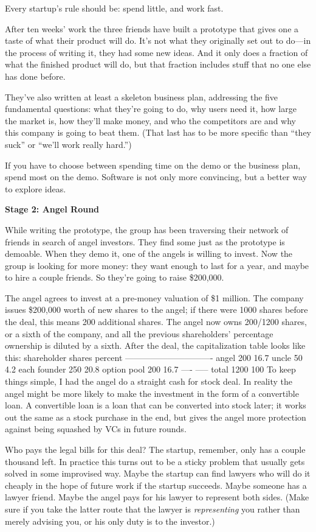 \documentclass[12pt]{book}
\begin{document}
Every startup's rule should be: spend little, and work fast.

After ten weeks' work the three friends have built a prototype that
gives one a taste of what their product will do. It's not what they
originally set out to do---in the process of writing it, they had some
new ideas. And it only does a fraction of what the finished product will
do, but that fraction includes stuff that no one else has done before.

They've also written at least a skeleton business plan, addressing the
five fundamental questions: what they're going to do, why users need it,
how large the market is, how they'll make money, and who the competitors
are and why this company is going to beat them. (That last has to be
more specific than ``they suck'' or ``we'll work really hard.'')

If you have to choose between spending time on the demo or the business
plan, spend most on the demo. Software is not only more convincing, but
a better way to explore ideas.

\textbf{Stage 2: Angel Round}

While writing the prototype, the group has been traversing their network
of friends in search of angel investors. They find some just as the
prototype is demoable. When they demo it, one of the angels is willing
to invest. Now the group is looking for more money: they want enough to
last for a year, and maybe to hire a couple friends. So they're going to
raise \$200,000.

The angel agrees to invest at a pre-money valuation of \$1 million. The
company issues \$200,000 worth of new shares to the angel; if there were
1000 shares before the deal, this means 200 additional shares. The angel
now owns 200/1200 shares, or a sixth of the company, and all the
previous shareholders' percentage ownership is diluted by a sixth. After
the deal, the capitalization table looks like this: shareholder shares
percent ------------------------------- angel 200 16.7 uncle 50 4.2 each
founder 250 20.8 option pool 200 16.7 ---- ----- total 1200 100 To keep
things simple, I had the angel do a straight cash for stock deal. In
reality the angel might be more likely to make the investment in the
form of a convertible loan. A convertible loan is a loan that can be
converted into stock later; it works out the same as a stock purchase in
the end, but gives the angel more protection against being squashed by
VCs in future rounds.

Who pays the legal bills for this deal? The startup, remember, only has
a couple thousand left. In practice this turns out to be a sticky
problem that usually gets solved in some improvised way. Maybe the
startup can find lawyers who will do it cheaply in the hope of future
work if the startup succeeds. Maybe someone has a lawyer friend. Maybe
the angel pays for his lawyer to represent both sides. (Make sure if you
take the latter route that the lawyer is \emph{representing} you rather
than merely advising you, or his only duty is to the investor.)
\end{document}
